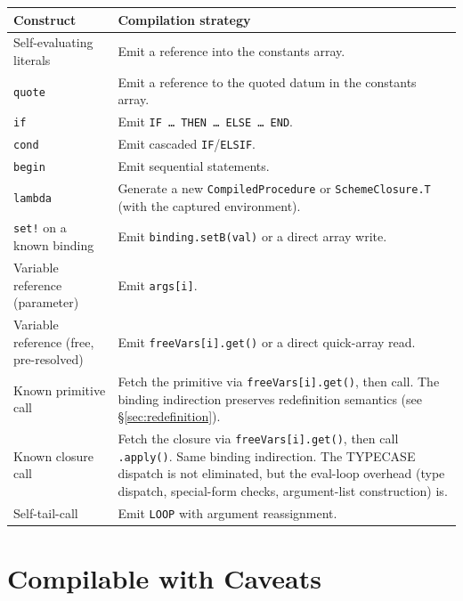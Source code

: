 \documentclass[12pt]{report}
\begin{document}
\begin{center}
\begin{longtable}{lp{9cm}}
\toprule
\textbf{Construct} & \textbf{Compilation strategy} \\
\midrule
\endhead
Self-evaluating literals &
  Emit a reference into the constants array. \\
\texttt{quote} &
  Emit a reference to the quoted datum in the constants array. \\
\texttt{if} &
  Emit \texttt{IF \ldots\ THEN \ldots\ ELSE \ldots\ END}. \\
\texttt{cond} &
  Emit cascaded \texttt{IF}/\texttt{ELSIF}. \\
\texttt{begin} &
  Emit sequential statements. \\
\texttt{lambda} &
  Generate a new \texttt{CompiledProcedure} or
  \texttt{SchemeClosure.T} (with the captured environment). \\
\texttt{set!} on a known binding &
  Emit \texttt{binding.setB(val)} or a direct array write. \\
Variable reference (parameter) &
  Emit \texttt{args[i]}. \\
Variable reference (free, pre-resolved) &
  Emit \texttt{freeVars[i].get()} or a direct quick-array read. \\
Known primitive call &
  Fetch the primitive via \texttt{freeVars[i].get()}, then call.
  The binding indirection preserves redefinition semantics
  (see \S\ref{sec:redefinition}). \\
Known closure call &
  Fetch the closure via \texttt{freeVars[i].get()}, then call
  \texttt{.apply()}.  Same binding indirection.  The TYPECASE
  dispatch is not eliminated, but the eval-loop overhead
  (type dispatch, special-form checks, argument-list construction)
  is. \\
Self-tail-call &
  Emit \texttt{LOOP} with argument reassignment. \\
\bottomrule
\end{longtable}
\end{center}

\section{Compilable with Caveats}
\end{document}
